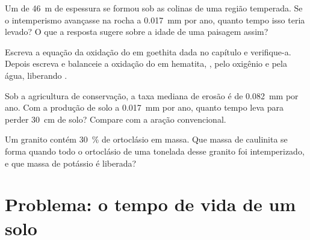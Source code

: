\begin{exercise}[$\star\star\star$]\label{exo:g10:soil-formation:12}
Um  de \qty{46}{m} de espessura se formou sob as colinas de uma
região temperada. Se o intemperismo avançasse na rocha a \qty{0.017}{mm} por
ano, quanto tempo isso teria levado? O que a resposta sugere sobre a idade
de uma paisagem assim?
\end{exercise}

\begin{exercise}[$\star\star\star$]\label{exo:g10:soil-formation:13}
Escreva a equação da oxidação do  em goethita dada no capítulo e
verifique-a. Depois escreva e balanceie a oxidação do  em
hematita, , pelo oxigênio e pela água, liberando .
\end{exercise}

\begin{exercise}[$\star\star\star$]\label{exo:g10:soil-formation:14}
Sob a agricultura de conservação, a taxa mediana de erosão é de
\qty{0.082}{mm} por ano. Com a produção de solo a \qty{0.017}{mm} por ano,
quanto tempo leva para perder \qty{30}{cm} de solo? Compare com a aração
convencional.
\end{exercise}

\begin{exercise}[$\star\star\star$]\label{exo:g10:soil-formation:15}
Um granito contém \qty{30}{\percent} de ortoclásio em massa. Que massa de
caulinita se forma quando todo o ortoclásio de uma tonelada desse granito
foi intemperizado, e que massa de potássio é liberada?
\end{exercise}

\section{Problema: o tempo de vida de um solo}

